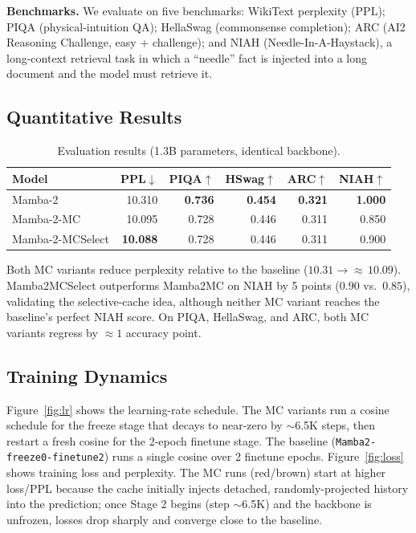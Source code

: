 \documentclass[conference]{IEEEtran}
\begin{document}
\textbf{Benchmarks.} We evaluate on five benchmarks: WikiText perplexity (PPL); PIQA (physical-intuition QA); HellaSwag (commonsense completion); ARC (AI2 Reasoning Challenge, easy + challenge); and NIAH (Needle-In-A-Haystack), a long-context retrieval task in which a ``needle'' fact is injected into a long document and the model must retrieve it.

\subsection{Quantitative Results}

\begin{table}[h]
\centering
\caption{Evaluation results (1.3B parameters, identical backbone).}
\label{tab:results}
\setlength{\tabcolsep}{4pt}
\begin{tabular}{lrrrrr}
\toprule
\textbf{Model} & \textbf{PPL}$\downarrow$ & \textbf{PIQA}$\uparrow$ & \textbf{HSwag}$\uparrow$ & \textbf{ARC}$\uparrow$ & \textbf{NIAH}$\uparrow$ \\
\midrule
Mamba-2          & 10.310 & \textbf{0.736} & \textbf{0.454} & \textbf{0.321} & \textbf{1.000} \\
Mamba-2-MC       & 10.095 & 0.728 & 0.446 & 0.311 & 0.850 \\
Mamba-2-MCSelect & \textbf{10.088} & 0.728 & 0.446 & 0.311 & 0.900 \\
\bottomrule
\end{tabular}
\end{table}

Both MC variants reduce perplexity relative to the baseline ($10.31\!\to\!{\approx}\,10.09$). Mamba2MCSelect outperforms Mamba2MC on NIAH by 5 points ($0.90$ vs.\ $0.85$), validating the selective-cache idea, although neither MC variant reaches the baseline's perfect NIAH score. On PIQA, HellaSwag, and ARC, both MC variants regress by $\approx 1$ accuracy point.

\subsection{Training Dynamics}

Figure~\ref{fig:lr} shows the learning-rate schedule. The MC variants run a cosine schedule for the freeze stage that decays to near-zero by $\sim$6.5K steps, then restart a fresh cosine for the 2-epoch finetune stage. The baseline (\texttt{Mamba2-freeze0-finetune2}) runs a single cosine over 2 finetune epochs. Figure~\ref{fig:loss} shows training loss and perplexity. The MC runs (red/brown) start at higher loss/PPL because the cache initially injects detached, randomly-projected history into the prediction; once Stage 2 begins (step $\sim$6.5K) and the backbone is unfrozen, losses drop sharply and converge close to the baseline.
\end{document}
